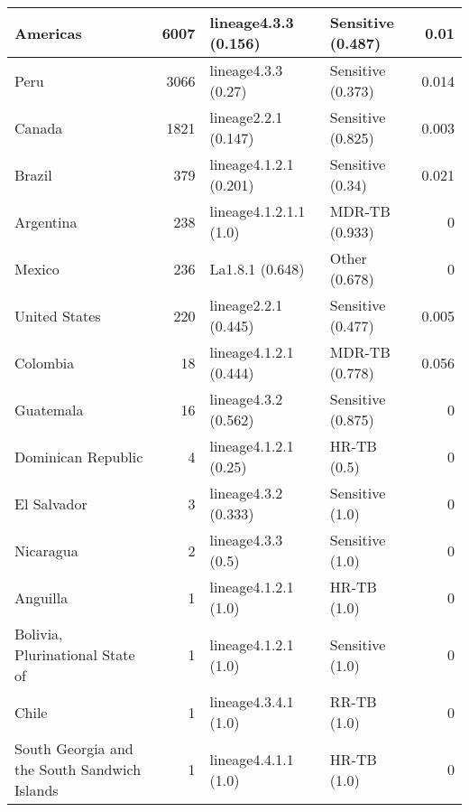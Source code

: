 \begin{tabular}{lrllr}
 Americas                                     &          6007 & lineage4.3.3 (0.156)     & Sensitive (0.487)   &      0.01  \\
 \hline

 Peru                                         &          3066 & lineage4.3.3 (0.27)      & Sensitive (0.373)   &      0.014 \\
 Canada                                       &          1821 & lineage2.2.1 (0.147)     & Sensitive (0.825)   &      0.003 \\
 Brazil                                       &           379 & lineage4.1.2.1 (0.201)   & Sensitive (0.34)    &      0.021 \\
 Argentina                                    &           238 & lineage4.1.2.1.1 (1.0)   & MDR-TB (0.933)      &      0     \\
 Mexico                                       &           236 & La1.8.1 (0.648)          & Other (0.678)       &      0     \\
 United States                                &           220 & lineage2.2.1 (0.445)     & Sensitive (0.477)   &      0.005 \\
 Colombia                                     &            18 & lineage4.1.2.1 (0.444)   & MDR-TB (0.778)      &      0.056 \\
 Guatemala                                    &            16 & lineage4.3.2 (0.562)     & Sensitive (0.875)   &      0     \\
 Dominican Republic                           &             4 & lineage4.1.2.1 (0.25)    & HR-TB (0.5)         &      0     \\
 El Salvador                                  &             3 & lineage4.3.2 (0.333)     & Sensitive (1.0)     &      0     \\
 Nicaragua                                    &             2 & lineage4.3.3 (0.5)       & Sensitive (1.0)     &      0     \\
 Anguilla                                     &             1 & lineage4.1.2.1 (1.0)     & HR-TB (1.0)         &      0     \\
 Bolivia, Plurinational State of              &             1 & lineage4.1.2.1 (1.0)     & Sensitive (1.0)     &      0     \\
 Chile                                        &             1 & lineage4.3.4.1 (1.0)     & RR-TB (1.0)         &      0     \\
 South Georgia and the South Sandwich Islands &             1 & lineage4.4.1.1 (1.0)     & HR-TB (1.0)         &      0     \\
 \hline


\end{tabular}
